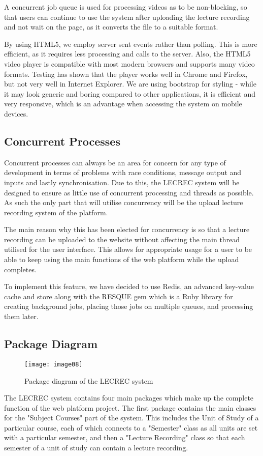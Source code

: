 \documentclass{article}
\begin{document}
A concurrent job queue is used for processing videos as to be non-blocking, so that users can continue to use the system after uploading the lecture recording and not wait on the page, as it converts the file to a suitable format. 

By using HTML5, we employ server sent events rather than polling. This is more efficient, as it requires less processing and calls to the server. Also, the HTML5 video player is compatible with most modern browsers and supports many video formats. Testing has shown that the player works well in Chrome and Firefox, but not very well in Internet Explorer. We are using bootstrap for styling - while it may look generic and boring compared to other applications, it is efficient and very responsive, which is an advantage when accessing the system on mobile devices.

\subsection{Concurrent Processes}
Concurrent processes can always be an area for concern for any type of development in terms of problems with race conditions, message output and inputs and lastly synchronisation. Due to this, the LECREC system will be designed to ensure as little use of concurrent processing and threads as possible. As such the only part that will utilise concurrency will be the upload lecture recording system of the platform. 

The main reason why this has been elected for concurrency is so that a lecture recording can be uploaded to the website without affecting the main thread utilised for the user interface. This allows for appropriate usage for a user to be able to keep using the main functions of the web platform while the upload completes.

To implement this feature, we have decided to use Redis, an advanced key-value cache and store along with the RESQUE gem which is a Ruby library for creating background jobs, placing those jobs on multiple queues, and processing them later.

\subsection{Package Diagram}
\begin{figure}[h!]
\centering
\texttt{[image: image08]}
\caption{Package diagram of the LECREC system}
\end{figure}
The LECREC system contains four main packages which make up the complete function of the web platform project. The first package contains the main classes for the "Subject Courses" part of the system. This includes the Unit of Study of a particular course, each of which connects to a "Semester" class as all units are set with a particular semester, and then a "Lecture Recording" class so that each semester of a unit of study can contain a lecture recording.
\end{document}

